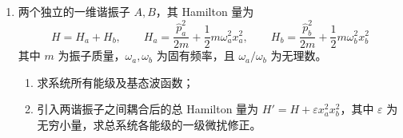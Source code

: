 \begin{enumerate}
{\begin{enumerate}
		\item 由对称性 $\langle x\rangle=0$，$\langle p\rangle=0$。
		\begin{align*}
			\langle x^2\rangle&=\int_{-\infty}^{+\infty}x^2|\psi(x)|^2\,dx=A^2\int_{-\infty}^{+\infty}x^2 e^{-x^2/(2\sigma^2)}\,dx\\
			&=\frac{1}{\sqrt{2\pi\sigma^2}}\cdot\sqrt{2\pi}\cdot\sigma^3=\sigma^2
		\end{align*}
		故 $\Delta x=\sqrt{\langle x^2\rangle-\langle x\rangle^2}=\sigma$。

		对动量：
		\begin{align*}
			\langle p^2\rangle&=\int_{-\infty}^{+\infty}p^2 P(p)\,dp=\sqrt{\frac{2\sigma^2}{\pi\hbar^2}}\int_{-\infty}^{+\infty}p^2 e^{-2\sigma^2 p^2/\hbar^2}\,dp\\
			&=\sqrt{\frac{2\sigma^2}{\pi\hbar^2}}\cdot\frac{\sqrt{\pi}}{2}\cdot\left(\frac{\hbar^2}{2\sigma^2}\right)^{3/2}=\frac{\hbar^2}{4\sigma^2}
		\end{align*}
		故 $\Delta p=\sqrt{\langle p^2\rangle-\langle p\rangle^2}=\dfrac{\hbar}{2\sigma}$。

		不确定度之积：
		\begin{align*}
			\Delta x\cdot\Delta p=\sigma\cdot\frac{\hbar}{2\sigma}=\frac{\hbar}{2}
		\end{align*}
		恰好等于不确定性原理的下界 $\hbar/2$，即 Gauss 波包为最小不确定态。
	\end{enumerate}
	}

	\item
	两个独立的一维谐振子 $A,B$，其 Hamilton 量为
	\[
	H=H_a+H_b,\qquad H_a=\frac{\hat{p}_a^2}{2m}+\frac{1}{2}m\omega_a^2 x_a^2,\qquad H_b=\frac{\hat{p}_b^2}{2m}+\frac{1}{2}m\omega_b^2 x_b^2
	\]
	其中 $m$ 为振子质量，$\omega_a,\omega_b$ 为固有频率，且 $\omega_a/\omega_b$ 为无理数。
	\begin{enumerate}
		\item 求系统所有能级及基态波函数；
		\item 引入两谐振子之间耦合后的总 Hamilton 量为 $H'=H+\varepsilon x_a^2 x_b^2$，其中 $\varepsilon$ 为无穷小量，求总系统各能级的一级微扰修正。
	\end{enumerate}

\end{enumerate}

